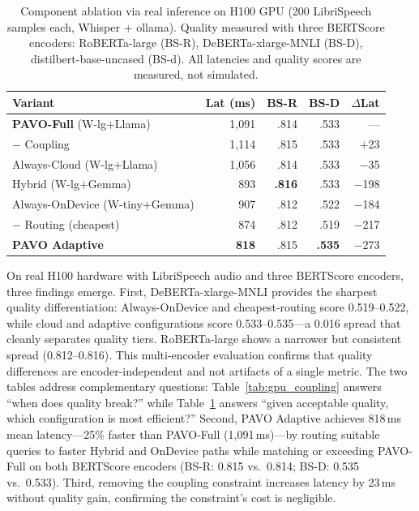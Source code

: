 \documentclass{article}
\begin{document}
\begin{table}[t]
\centering
\caption{Component ablation via real inference on H100 GPU (200 LibriSpeech samples each, Whisper + ollama). Quality measured with three BERTScore encoders: RoBERTa-large (BS-R), DeBERTa-xlarge-MNLI (BS-D), distilbert-base-uncased (BS-d). All latencies and quality scores are measured, not simulated.}
\label{tab:component_ablation}
\small
\setlength{\tabcolsep}{3pt}
\begin{tabular}{lrrrr}
\toprule
Variant & Lat (ms) & BS-R & BS-D & $\Delta$Lat \\
\midrule
\textbf{PAVO-Full} (W-lg+Llama) & 1{,}091 & .814 & .533 & --- \\
$-$ Coupling & 1{,}114 & .815 & .533 & $+$23 \\
Always-Cloud (W-lg+Llama) & 1{,}056 & .814 & .533 & $-$35 \\
Hybrid (W-lg+Gemma) & 893 & \textbf{.816} & .533 & $-$198 \\
Always-OnDevice (W-tiny+Gemma) & 907 & .812 & .522 & $-$184 \\
$-$ Routing (cheapest) & 874 & .812 & .519 & $-$217 \\
\textbf{PAVO Adaptive} & \textbf{818} & .815 & \textbf{.535} & $-$273 \\
\bottomrule
\end{tabular}
\end{table}

On real H100 hardware with LibriSpeech audio and three BERTScore encoders, three findings emerge. First, DeBERTa-xlarge-MNLI provides the sharpest quality differentiation: Always-OnDevice and cheapest-routing score 0.519--0.522, while cloud and adaptive configurations score 0.533--0.535---a 0.016 spread that cleanly separates quality tiers. RoBERTa-large shows a narrower but consistent spread (0.812--0.816). This multi-encoder evaluation confirms that quality differences are encoder-independent and not artifacts of a single metric. The two tables address complementary questions: Table~\ref{tab:gpu_coupling} answers ``when does quality break?'' while Table~\ref{tab:component_ablation} answers ``given acceptable quality, which configuration is most efficient?'' Second, PAVO Adaptive achieves 818\,ms mean latency---25\% faster than PAVO-Full (1{,}091\,ms)---by routing suitable queries to faster Hybrid and OnDevice paths while matching or exceeding PAVO-Full on both BERTScore encoders (BS-R: 0.815 vs.\ 0.814; BS-D: 0.535 vs.\ 0.533). Third, removing the coupling constraint increases latency by 23\,ms without quality gain, confirming the constraint's cost is negligible.
\end{document}
